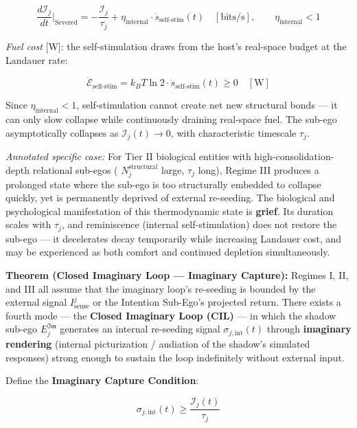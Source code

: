 \documentclass[11pt,a4paper]{article}
\theoremstyle{definition}
\theoremstyle{remark}
\begin{document}
\begin{equation}
\boxed{\frac{d\mathcal{I}_j}{dt}\Bigg|_{\text{Severed}} = -\frac{\mathcal{I}_j}{\tau_j} + \eta_{\text{internal}} \cdot \dot{s}_{\text{self-stim}}(t) \quad [\text{bits/s}], \qquad \eta_{\text{internal}} < 1}
\end{equation}


\textit{Fuel cost} [W]: the self-stimulation draws from the host's real-space budget at the Landauer rate:


\begin{equation}
\boxed{\dot{\mathcal{E}}_{\text{self-stim}} = k_B T \ln 2 \cdot \dot{s}_{\text{self-stim}}(t) \geq 0 \quad [\text{W}]}
\end{equation}


Since $\eta_{\text{internal}} < 1$, self-stimulation cannot create net new structural bonds — it can only slow collapse while continuously draining real-space fuel. The sub-ego asymptotically collapses as $\mathcal{I}_j(t) \to 0$, with characteristic timescale $\tau_j$.

\textit{Annotated specific case:} For Tier II biological entities with high-consolidation-depth relational sub-egos ( $N_j^{\text{structural}}$ large, $\tau_j$ long), Regime III produces a prolonged state where the sub-ego is too structurally embedded to collapse quickly, yet is permanently deprived of external re-seeding. The biological and psychological manifestation of this thermodynamic state is \textbf{grief}. Its duration scales with $\tau_j$, and reminiscence (internal self-stimulation) does not restore the sub-ego — it decelerates decay temporarily while increasing Landauer cost, and may be experienced as both comfort and continued depletion simultaneously.

\textbf{Theorem (Closed Imaginary Loop — Imaginary Capture):} Regimes I, II, and III all assume that the imaginary loop's re-seeding is bounded by the external signal $I_{\text{sense}}^j$ or the Intention Sub-Ego's projected return. There exists a fourth mode — the \textbf{Closed Imaginary Loop (CIL)} — in which the shadow sub-ego $E_j^{\mathfrak{Im}}$ generates an internal re-seeding signal $\sigma_{j,\text{int}}(t)$ through \textbf{imaginary rendering} (internal picturization / audiation of the shadow's simulated responses) strong enough to sustain the loop indefinitely without external input.

Define the \textbf{Imaginary Capture Condition}:


\begin{equation}
\boxed{\sigma_{j,\text{int}}(t) \geq \frac{\mathcal{I}_j(t)}{\tau_j}}
\end{equation}
\end{document}
